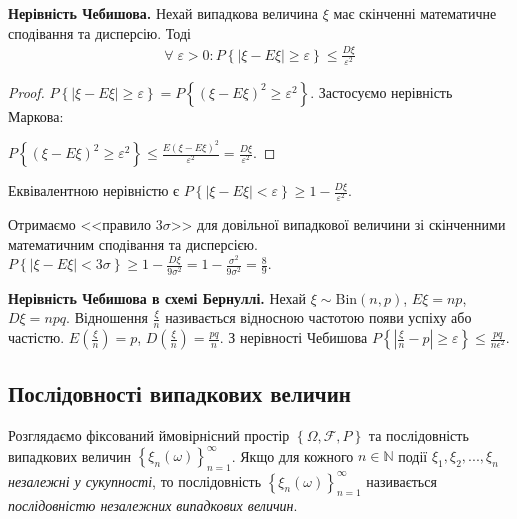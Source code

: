 \noindent\textbf{Нерівність Чебишова.} Нехай випадкова величина $\xi$ має скінченні математичне сподівання та дисперсію.
Тоді
\begin{gather}
    \forall \; \varepsilon >0 : P\left\{ \left|\xi - E\xi\right| \geq \varepsilon\right\} \leq \frac{D\xi}{\varepsilon^2}
\end{gather}
\begin{proof}
    $P\left\{ |\xi - E\xi| \geq \varepsilon\right\} = P\left\{ (\xi - E\xi)^2 \geq \varepsilon^2\right\}$.
    Застосуємо нерівність Маркова:
    
    \noindent $P\left\{ (\xi - E\xi)^2 \geq \varepsilon^2\right\} \leq \frac{E(\xi - E\xi)^2}{\varepsilon^2} = \frac{D\xi}{\varepsilon^2}$.
\end{proof}
\begin{remark}
    Еквівалентною нерівністю є $P\left\{ \left|\xi - E\xi\right| < \varepsilon\right\} \geq 1 - \frac{D\xi}{\varepsilon^2}$.
\end{remark}
\begin{example}
    Отримаємо <<правило $3 \sigma$>> для довільної випадкової величини зі скінченними математичним сподівання та дисперсією.
    $P\left\{ |\xi - E\xi| < 3 \sigma\right\} \geq 1 - \frac{D\xi}{9 \sigma^2} = 1 - \frac{\sigma^2}{9 \sigma^2} = \frac{8}{9}$.
\end{example}
\noindent\textbf{Нерівність Чебишова в схемі Бернуллі.} Нехай $\xi \sim \mathrm{Bin}(n, p)$, $E\xi = np$, $D\xi = npq$.
Відношення $\frac{\xi}{n}$ називається відносною частотою появи успіху або частістю. $E\left( \frac{\xi}{n}\right) = p$, 
$D\left( \frac{\xi}{n}\right) = \frac{pq}{n}$. З нерівності Чебишова 
$P\left\{ \left|\frac{\xi}{n} - p\right| \geq \varepsilon\right\} \leq \frac{pq}{n \epsilon^2}$.

\subsection{Послідовності випадкових величин}
Розглядаємо фіксований ймовірнісний простір $\left\{ \Omega, \mathcal{F}, P\right\}$ та
послідовність випадкових величин $\left\{ \xi_n (\omega)\right\}_{n=1}^{\infty}$.
Якщо для кожного $n \in \mathbb{N}$ події $\xi_1, \xi_2, ..., \xi_n$ \emph{незалежні у сукупності},
то послідовність $\left\{ \xi_n (\omega)\right\}_{n=1}^{\infty}$ називається \emph{послідовністю незалежних випадкових величин}.

